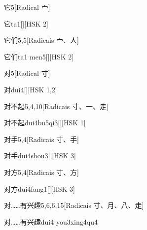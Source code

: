 \begin{entry}{它}{5}[Radical ⼧]
  \begin{phonetics}{它}{ta1}[][HSK 2]
  \end{phonetics}
\end{entry}

\begin{entry}{它们}{5,5}[Radicais ⼧、⼈]
  \begin{phonetics}{它们}{ta1 men5}[][HSK 2]
  \end{phonetics}
\end{entry}

\begin{entry}{对}{5}[Radical ⼨]
  \begin{phonetics}{对}{dui4}[][HSK 1,2]
  \end{phonetics}
\end{entry}

\begin{entry}{对不起}{5,4,10}[Radicais ⼨、⼀、⾛]
  \begin{phonetics}{对不起}{dui4bu5qi3}[][HSK 1]
  \end{phonetics}
\end{entry}

\begin{entry}{对手}{5,4}[Radicais ⼨、⼿]
  \begin{phonetics}{对手}{dui4shou3}[][HSK 3]
  \end{phonetics}
\end{entry}

\begin{entry}{对方}{5,4}[Radicais ⼨、⽅]
  \begin{phonetics}{对方}{dui4fang1}[][HSK 3]
  \end{phonetics}
\end{entry}

\begin{entry}{对……有兴趣}{5,6,6,15}[Radicais ⼨、⽉、⼋、⾛]
  \begin{phonetics}{对……有兴趣}{dui4 you3xing4qu4}
  \end{phonetics}
\end{entry}


